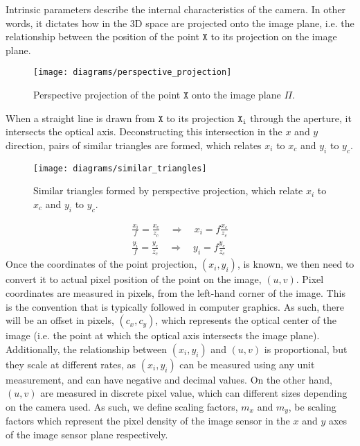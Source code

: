 Intrinsic parameters describe the internal characteristics of the camera. In other words, it dictates how in the 3D space are projected onto the image plane, i.e. the relationship between the position of the point $\mathtt{X}$ to its projection on the image plane.

\begin{figure}[H]
    \centering
    \texttt{[image: diagrams/perspective\_projection]}
    \caption{Perspective projection of the point $\mathtt{X}$ onto the image plane $\Pi$.}
\end{figure}
When a straight line is drawn from $\mathtt{X}$ to its projection $\mathtt{X_i}$ through the aperture, it intersects the optical axis. Deconstructing this intersection in the $x$ and $y$ direction, pairs of similar triangles are formed, which relates $x_i$ to $x_c$ and $y_i$ to $y_c$.
\begin{figure}[H]
    \centering
    \texttt{[image: diagrams/similar\_triangles]}
    \caption{Similar triangles formed by perspective projection, which relate $x_i$ to $x_c$ and $y_i$ to $y_c$.} \label{fig:similar_triangles}
\end{figure}
\begin{subequations}
    \begin{gather}
        \frac{x_i}{f} = \frac{x_c}{z_c} \quad \Longrightarrow \quad x_i = f \frac{x_c}{z_c} \label{subeq:xi_result}\\
        \frac{y_i}{f} = \frac{y_c}{z_c} \quad \Longrightarrow \quad y_i = f \frac{y_c}{z_c} \label{subeq:yi_result}
    \end{gather}
\end{subequations}
Once the coordinates of the point projection, $(x_i, y_i)$, is known, we then need to convert it to actual pixel position of the point on the image, $(u, v)$. Pixel coordinates are measured in pixels, from the left-hand corner of the image. This is the convention that is typically followed in computer graphics. As such, there will be an offset in pixels, $(c_x, c_y)$, which represents the optical center of the image (i.e. the point at which the optical axis intersects the image plane). Additionally, the relationship between $(x_i, y_i)$ and $(u, v)$ is proportional, but they scale at different rates, as $(x_i, y_i)$ can be measured using any unit measurement, and can have negative and decimal values. On the other hand, $(u,v)$ are measured in discrete pixel value, which can different sizes depending on the camera used. As such, we define scaling factors, $m_x$ and $m_y$, be scaling factors which represent the pixel density of the image sensor in the $x$ and $y$ axes of the image sensor plane respectively.
